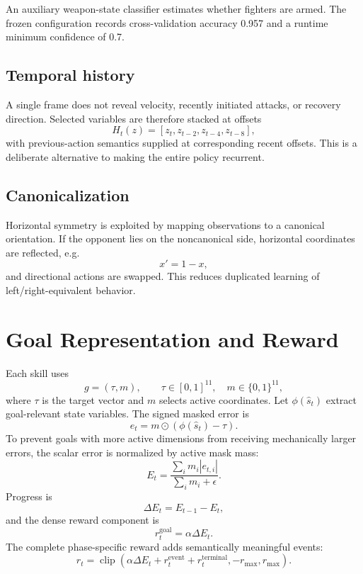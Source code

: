 \documentclass[11pt]{article}
\begin{document}
An auxiliary weapon-state classifier estimates whether fighters are armed. The frozen configuration records cross-validation accuracy 0.957 and a runtime minimum confidence of 0.7.

\subsection{Temporal history}
A single frame does not reveal velocity, recently initiated attacks, or recovery direction. Selected variables are therefore stacked at offsets
\begin{equation}
H_t(z)=[z_t,z_{t-2},z_{t-4},z_{t-8}],
\end{equation}
with previous-action semantics supplied at corresponding recent offsets. This is a deliberate alternative to making the entire policy recurrent.

\subsection{Canonicalization}
Horizontal symmetry is exploited by mapping observations to a canonical orientation. If the opponent lies on the noncanonical side, horizontal coordinates are reflected, e.g.
\begin{equation}
x' = 1-x,
\end{equation}
and directional actions are swapped. This reduces duplicated learning of left/right-equivalent behavior.

\section{Goal Representation and Reward}
Each skill uses
\begin{equation}
g=(\tau,m),\qquad \tau\in[0,1]^{11},\quad m\in\{0,1\}^{11},
\end{equation}
where $\tau$ is the target vector and $m$ selects active coordinates. Let $\phi(\hat{s}_t)$ extract goal-relevant state variables. The signed masked error is
\begin{equation}
e_t=m\odot(\phi(\hat{s}_t)-\tau).
\end{equation}
To prevent goals with more active dimensions from receiving mechanically larger errors, the scalar error is normalized by active mask mass:
\begin{equation}
E_t=\frac{\sum_i m_i|e_{t,i}|}{\sum_i m_i+\epsilon}.
\end{equation}
Progress is
\begin{equation}
\Delta E_t=E_{t-1}-E_t,
\end{equation}
and the dense reward component is
\begin{equation}
r_t^{\mathrm{goal}}=\alpha\Delta E_t.
\end{equation}
The complete phase-specific reward adds semantically meaningful events:
\begin{equation}
r_t=\operatorname{clip}\!\left(\alpha\Delta E_t+r_t^{\mathrm{event}}+r_t^{\mathrm{terminal}},-r_{\max},r_{\max}\right).
\end{equation}
\end{document}
